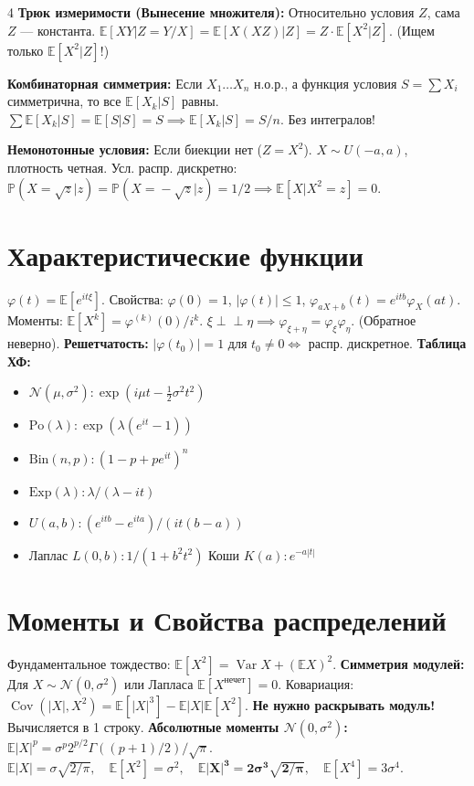 \documentclass[a4paper, landscape]{article}
\newcommand{\E}{\mathbb{E}}
\renewcommand{\P}{\mathbb{P}}
\newcommand{\N}{\mathcal{N}}
\DeclareMathOperator{\Var}{Var}
\DeclareMathOperator{\Cov}{Cov}
\begin{document}
\begin{multicols*}{4}
\textbf{Трюк измеримости (Вынесение множителя):}
Относительно условия $Z$, сама $Z$ — константа.
$\E[XY | Z=Y/X] = \E[X(XZ)|Z] = Z \cdot \E[X^2|Z]$. (Ищем только $\E[X^2|Z]$!)

\textbf{Комбинаторная симметрия:} Если $X_1 \dots X_n$ н.о.р., а функция условия $S = \sum X_i$ симметрична, то все $\E[X_k|S]$ равны.
$\sum \E[X_k|S] = \E[S|S] = S \implies \E[X_k|S] = S/n$. Без интегралов!

\textbf{Немонотонные условия:} Если биекции нет ($Z=X^2$).
$X \sim U(-a,a)$, плотность четная. Усл. распр. дискретно: $\P(X\!=\!\sqrt{z}|z) = \P(X\!=\!-\sqrt{z}|z) = 1/2 \implies \E[X|X^2=z] = 0$.

\section*{Характеристические функции}
$\varphi(t) = \E[e^{it\xi}]$. Свойства: $\varphi(0)\!=\!1$, $|\varphi(t)| \!\le\! 1$, $\varphi_{aX+b}(t) \!=\! e^{itb}\varphi_X(at)$. Моменты: $\E[X^k] = \varphi^{(k)}(0) / i^k$.
$\xi \perp\!\!\perp \eta \implies \varphi_{\xi+\eta} = \varphi_\xi \varphi_\eta$. (Обратное неверно).
\textbf{Решетчатость:} $|\varphi(t_0)|=1$ для $t_0 \ne 0 \iff$ распр. дискретное.
\textbf{Таблица ХФ:}
\begin{itemize}
    \item $\N(\mu,\sigma^2): \exp(i\mu t - \frac{1}{2}\sigma^2 t^2)$
    \item $\text{Po}(\lambda): \exp(\lambda(e^{it}-1))$
    \item $\text{Bin}(n,p): (1-p+pe^{it})^n$
    \item $\text{Exp}(\lambda): \lambda / (\lambda-it)$
    \item $U(a,b): (e^{itb}-e^{ita}) / (it(b-a))$
    \item Лаплас $L(0,b): 1 / (1+b^2 t^2)$ \quad Коши $K(a): e^{-a|t|}$
\end{itemize}

\section*{Моменты и Свойства распределений}
Фундаментальное тождество: $\E[X^2] = \Var X + (\E X)^2$. 
\textbf{Симметрия модулей:} Для $X \sim \N(0, \sigma^2)$ или Лапласа $\E[X^{\text{нечет}}]=0$. Ковариация: $\Cov(|X|, X^2) = \E[|X|^3] - \E|X|\E[X^2]$. \textbf{Не нужно раскрывать модуль!} Вычисляется в 1 строку.
\textbf{Абсолютные моменты $\N(0, \sigma^2)$:}
$\E|X|^p = \sigma^p 2^{p/2} \Gamma((p+1)/2)/\sqrt{\pi}$.
$\E|X| = \sigma \sqrt{2/\pi}, \quad \E[X^2]=\sigma^2, \quad \mathbf{\E|X|^3 = 2\sigma^3 \sqrt{2/\pi}}, \quad \E[X^4]=3\sigma^4$.


\end{multicols*}
\end{document}
